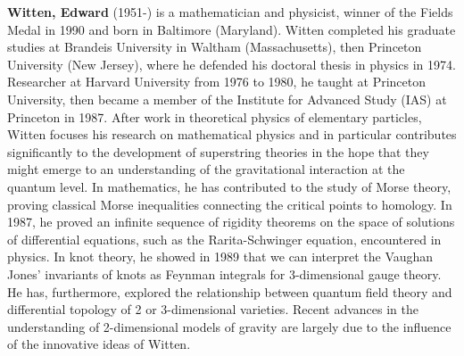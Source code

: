 \textbf{Witten, Edward} (1951-) is a mathematician and physicist, winner of the Fields Medal in 1990 and born in Baltimore (Maryland). Witten completed his graduate studies at Brandeis University in Waltham (Massachusetts), then Princeton University (New Jersey), where he defended his doctoral thesis in physics in 1974. Researcher at Harvard University from 1976 to 1980, he taught at Princeton University, then became a member of the Institute for Advanced Study (IAS) at Princeton in 1987. After work in theoretical physics of elementary particles, Witten focuses his research on mathematical physics and in particular contributes significantly to the development of superstring theories in the hope that they might emerge to an understanding of the gravitational interaction at the quantum level. In mathematics, he has contributed to the study of Morse theory, proving classical Morse inequalities connecting the critical points to homology. In 1987, he proved an infinite sequence of rigidity theorems on the space of solutions of differential equations, such as the Rarita-Schwinger equation, encountered in physics. In knot theory, he showed in 1989 that we can interpret the Vaughan Jones' invariants of knots as Feynman integrals for 3-dimensional gauge theory. He has, furthermore, explored the relationship between quantum field theory and differential topology of 2 or 3-dimensional varieties. Recent advances in the understanding of 2-dimensional models of gravity are largely due to the influence of the innovative ideas of Witten.

{}

